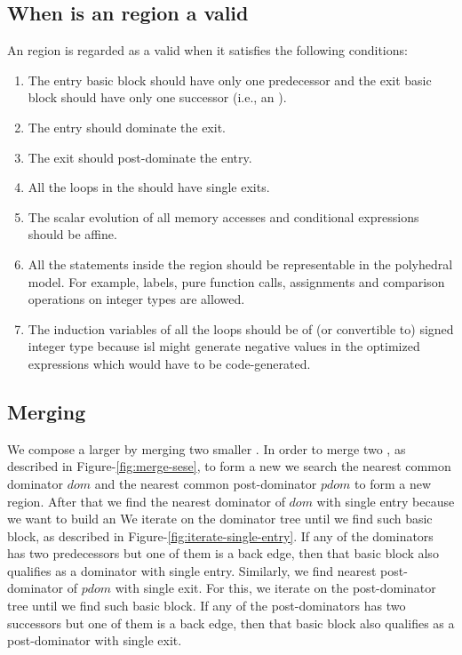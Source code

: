 \documentclass{sig-alternate}
\begin{document}
\subsection{When is an \SESE{} region a valid }
\label{subsec:validity}
An \SESE{} region is regarded as a valid \SCoP{} when it satisfies the following
conditions:
\begin{enumerate}
\item The entry basic block should have only one predecessor and the exit
  basic block should have only one successor (i.e., an \SESE{}).
\item The entry should dominate the exit.
\item The exit should post-dominate the entry.
\item All the loops in the \SESE{} should have single exits.
\item The scalar evolution of all memory accesses and conditional expressions
  should be affine.
\item All the statements inside the region should be representable in the
  polyhedral model.  For example, labels, pure function calls, assignments and
  comparison operations on integer types are allowed.
\item The induction variables of all the loops should be of (or convertible to)
  signed integer type because isl might generate negative values in the optimized
  expressions which would have to be code-generated.
\end{enumerate}

\subsection{Merging }
\label{subsec:merge-sese}

We compose a larger \SESE{} by merging two smaller . In order to merge two
, as described in Figure-\ref{fig:merge-sese}, to form a new \SESE{,} we
search the nearest common dominator $dom$ and the nearest common post-dominator
$pdom$ to form a new region.  After that we find the nearest dominator of $dom$
with single entry because we want to build an   We iterate on the dominator
tree until we find such basic block, as described in
Figure-\ref{fig:iterate-single-entry}.  If any of the dominators has two
predecessors but one of them is a back edge, then that basic block also
qualifies as a dominator with single entry.  Similarly, we find nearest
post-dominator of $pdom$ with single exit.  For this, we iterate on the
post-dominator tree until we find such basic block.  If any of the
post-dominators has two successors but one of them is a back edge, then that
basic block also qualifies as a post-dominator with single exit.
\end{document}
